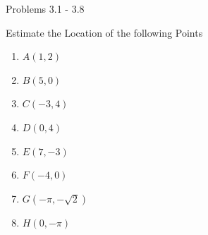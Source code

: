 \documentclass[14pt,aspectratio=169]{beamer}
\begin{document}
\begin{frame}{Problems 3.1 - 3.8}
 \begin{exampleblock}{Estimate the Location of the following Points}
  \begin{enumerate}
   \item $A(1,2)$
   \item $B(5,0)$
   \item $C(-3,4)$
   \item $D(0,4)$
   \item $E(7,-3)$
   \item $F(-4,0)$
   \item $G(-\pi,-\sqrt{2})$
   \item $H(0, -\pi)$
  \end{enumerate}

 \end{exampleblock}

\end{frame}
\end{document}
